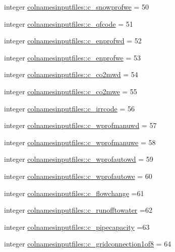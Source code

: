 \begin{DoxyCompactItemize}
integer \hyperlink{namespacecolnamesinputfiles_a251ecc3acc1ca0dcae1be9dbc9885baf}{colnamesinputfiles\+::c\+\_\+snowprofwe} = 50
\item 
integer \hyperlink{namespacecolnamesinputfiles_a9c2f084e29ab3253aba16f25f6f57e6d}{colnamesinputfiles\+::c\+\_\+qfcode} = 51
\item 
integer \hyperlink{namespacecolnamesinputfiles_a30f510fdf83f7dfd68c79200fc219f72}{colnamesinputfiles\+::c\+\_\+enprofwd} = 52
\item 
integer \hyperlink{namespacecolnamesinputfiles_a760f8b98c76316c68bc97fcfd4acd92a}{colnamesinputfiles\+::c\+\_\+enprofwe} = 53
\item 
integer \hyperlink{namespacecolnamesinputfiles_a458ceb8fda92721080e551c95622d355}{colnamesinputfiles\+::c\+\_\+co2mwd} = 54
\item 
integer \hyperlink{namespacecolnamesinputfiles_aab9a964f8a068c45d8e4eb0bde1733ca}{colnamesinputfiles\+::c\+\_\+co2mwe} = 55
\item 
integer \hyperlink{namespacecolnamesinputfiles_a334ff4db36344c4e3aebd61f59639481}{colnamesinputfiles\+::c\+\_\+irrcode} = 56
\item 
integer \hyperlink{namespacecolnamesinputfiles_a8801ad8f0d01b5ecf6ffcbb91d2d1dc8}{colnamesinputfiles\+::c\+\_\+wprofmanuwd} = 57
\item 
integer \hyperlink{namespacecolnamesinputfiles_aa817b7d7af9c9c5cc29439f3da74e223}{colnamesinputfiles\+::c\+\_\+wprofmanuwe} = 58
\item 
integer \hyperlink{namespacecolnamesinputfiles_a0e3d887c82c9d58aa3907e3d53adbc74}{colnamesinputfiles\+::c\+\_\+wprofautowd} = 59
\item 
integer \hyperlink{namespacecolnamesinputfiles_a294f4adfdd15bb75ea3188f7fc150ab7}{colnamesinputfiles\+::c\+\_\+wprofautowe} = 60
\item 
integer \hyperlink{namespacecolnamesinputfiles_a9204c1d2e3a2d060af53f0ab1abacd16}{colnamesinputfiles\+::c\+\_\+flowchange} =61
\item 
integer \hyperlink{namespacecolnamesinputfiles_ad42336bef58759c0095ebca5fa4a45dd}{colnamesinputfiles\+::c\+\_\+runofftowater} =62
\item 
integer \hyperlink{namespacecolnamesinputfiles_a0c69a490bdd7669556955c9bbb07f185}{colnamesinputfiles\+::c\+\_\+pipecapacity} =63
\item 
integer \hyperlink{namespacecolnamesinputfiles_a2ea9c9a2febca1f86790acc7c1204557}{colnamesinputfiles\+::c\+\_\+gridconnection1of8} = 64
\item 

\end{DoxyCompactItemize}
